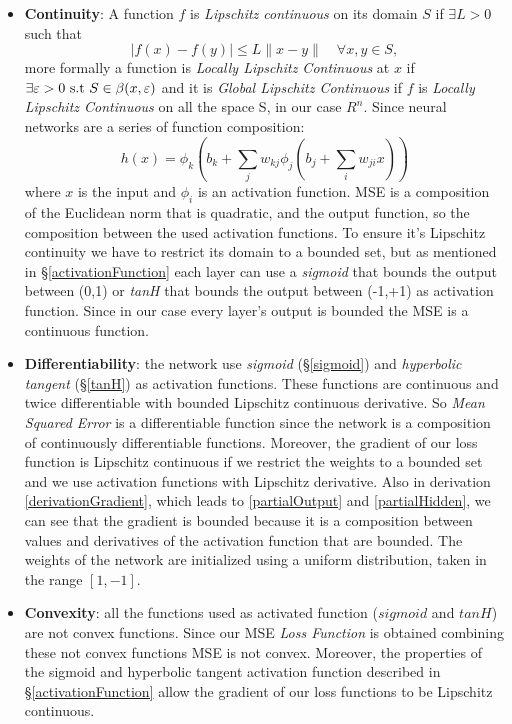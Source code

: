 \begin{itemize}
	\item \textbf{Continuity}: A function $f$ is \textit{ Lipschitz continuous} on its domain $S$ if $\exists L>0$ such that
	\begin{equation}
	|f(x)-f(y)| \leq L\parallel x-y\parallel \quad \forall x,y \in S,  
	\end{equation} 
	more formally a function is  \textit{Locally Lipschitz Continuous} at $x$ if $\exists \varepsilon >0 \textnormal{ s.t } S \in \beta(x,\varepsilon) $
	and it is \textit{Global Lipschitz Continuous} if $f$ is \textit{Locally Lipschitz Continuous} on all the space S, in our case $R^n$.
	Since neural networks are a series of function composition: 
	\begin{equation}
	h(x) = \phi_{k}(b_{k} + \sum_{j}w_{kj} \phi_{j}(b_{j} + \sum_{i}w_{ji}x))
	\end{equation}
	where $x$ is the input and $\phi_{i}$ is an activation function. MSE is a composition of the Euclidean norm that is quadratic, and the output function, so the composition between the used activation functions. To ensure it's Lipschitz continuity we have to restrict its domain to a bounded set, but as mentioned in \S \ref{activationFunction} each layer can use a \textit{sigmoid} that bounds the output between (0,1) or \textit{tanH} that bounds the output  between (-1,+1) as activation function. Since in our case every layer's output is bounded the MSE is a continuous function.	
	\item  \textbf{Differentiability}:  the network use \textit{sigmoid} (\S \ref{sigmoid}) and \textit{hyperbolic tangent} (\S \ref{tanH}) as activation functions. These functions are continuous and twice differentiable with bounded Lipschitz continuous derivative. So \textit{Mean Squared Error} is a differentiable function since the network is a composition of continuously differentiable functions. Moreover, the gradient of our loss function is Lipschitz continuous if we restrict the weights to a bounded set and we use activation functions with Lipschitz derivative. Also in derivation \ref{derivationGradient}, which leads to \ref{partialOutput} and \ref{partialHidden}, we can see that the gradient is bounded because it is a composition between values and derivatives of the activation function that are bounded. The weights of the network are initialized using a uniform distribution, taken in the range $[1,-1]$.
	\item \textbf{Convexity}: all the functions used as activated function ($sigmoid$ and $tanH$) are not convex functions. Since our MSE \textit{Loss Function} is obtained combining these not convex functions MSE is not convex. Moreover, the properties of the sigmoid and hyperbolic tangent activation function described in \S \ref{activationFunction} allow the gradient of our loss functions to be Lipschitz continuous.
\end{itemize}

